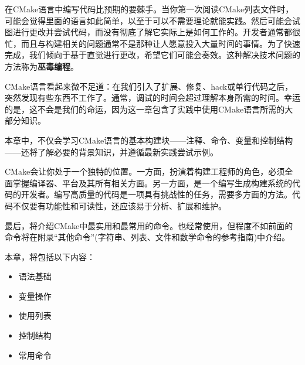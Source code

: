 在CMake语言中编写代码比预期的要棘手。当你第一次阅读CMake列表文件时，可能会觉得里面的语言如此简单，以至于可以不需要理论就能实践。然后可能会试图进行更改并尝试代码，而没有彻底了解它实际上是如何工作的。开发者通常都很忙，而且与构建相关的问题通常不是那种让人愿意投入大量时间的事情。为了快速完成，我们倾向于基于直觉进行更改，希望它们可能会奏效。这种解决技术问题的方法称为\textbf{巫毒编程}。

CMake语言看起来微不足道：在我们引入了扩展、修复、hack或单行代码之后，突然发现有些东西不工作了。通常，调试的时间会超过理解本身所需的时间。幸运的是，这不会是我们的命运，因为这一章包含了实践中使用CMake语言所需的大部分知识。

本章中，不仅会学习CMake语言的基本构建块——注释、命令、变量和控制结构——还将了解必要的背景知识，并遵循最新实践尝试示例。

CMake会让你处于一个独特的位置。一方面，扮演着构建工程师的角色，必须全面掌握编译器、平台及其所有相关方面。另一方面，是一个编写生成构建系统的代码的开发者。编写高质量的代码是一项具有挑战性的任务，需要多方面的方法。代码不仅要有功能性和可读性，还应该易于分析、扩展和维护。

最后，将介绍CMake中最实用和最常用的命令。也经常使用，但程度不如前面的命令将在附录“其他命令”(字符串、列表、文件和数学命令的参考指南)中介绍。

本章，将包括以下内容：

\begin{itemize}
\item
语法基础

\item
变量操作

\item
使用列表

\item
控制结构

\item
常用命令
\end{itemize}


































